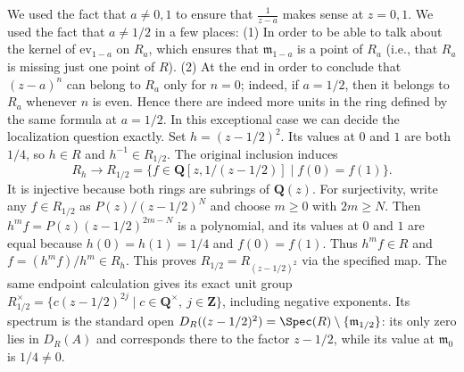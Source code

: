 \begin{example}
\medskip\noindent
We used the fact that $a\neq 0, 1$ to ensure that
$\frac{1}{z-a}$ makes sense at $z = 0, 1$.  We used the fact that
$a\neq 1/2$ in a few places: (1) In order to be able to talk about
the kernel of $\text{ev}_{1-a}$ on $R_a$, which ensures that
$\mathfrak{m}_{1-a}$ is a point of $R_a$ (i.e., that $R_a$ is
missing just one point of $R$). (2) At the end in order to conclude
that $(z-a)^n$ can belong to $R_a$ only for $n = 0$; indeed, if
$a = 1/2$, then it belongs to $R_a$ whenever $n$ is even. Hence
there are indeed more units in the ring defined by the same formula
at $a=1/2$. In this exceptional case we can decide the localization
question exactly. Set $h=(z-1/2)^2$. Its values at $0$ and $1$ are
both $1/4$, so $h\in R$ and $h^{-1}\in R_{1/2}$.
The original inclusion induces
$$
R_h\longrightarrow
R_{1/2}=\{f\in\mathbf Q[z,1/(z-1/2)]\mid f(0)=f(1)\}.
$$
It is injective because both rings are subrings of $\mathbf Q(z)$.
For surjectivity, write any $f\in R_{1/2}$ as
$P(z)/(z-1/2)^N$ and choose $m\geq0$ with $2m\geq N$.
Then $h^mf=P(z)(z-1/2)^{2m-N}$ is a polynomial, and its values at
$0$ and $1$ are equal because $h(0)=h(1)=1/4$ and $f(0)=f(1)$.
Thus $h^mf\in R$ and $f=(h^mf)/h^m\in R_h$.
This proves $R_{1/2}=R_{(z-1/2)^2}$ via the specified map.
The same endpoint calculation gives its exact unit group
$R_{1/2}^{\times}=\{c(z-1/2)^{2j}\mid c\in\mathbf Q^{\times},\ j\in\mathbf Z\}$,
including negative exponents. Its spectrum is the standard open
$D_R((z-1/2)^2)=\Spec(R)\setminus\{\mathfrak m_{1/2}\}$:
its only zero lies in $D_R(A)$ and corresponds there to the factor
$z-1/2$, while its value at $\mathfrak m_0$ is $1/4\ne0$.
\end{example}
